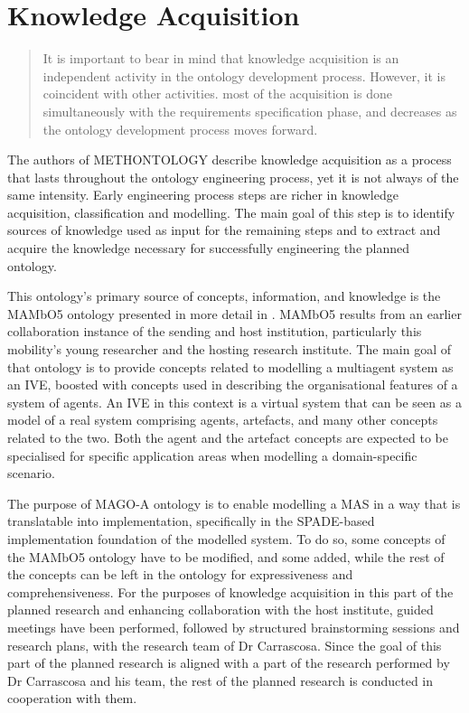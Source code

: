 \chapter{Knowledge Acquisition}\label{ch:Knowledge Acquisition}


\blockquote[{{\cite[p. 37]{fernandez-lopez1997METHONTOLOGYOntologicalArt}}}]{It is important to bear in mind that knowledge acquisition is an independent activity in the ontology development process. However, it is coincident with other activities. \textelp{} most of the acquisition is done simultaneously with the requirements specification phase, and decreases as the ontology development process moves forward.}

The authors of METHONTOLOGY describe knowledge acquisition as a process that lasts throughout the ontology engineering process, yet it is not always of the same intensity. Early engineering process steps are richer in knowledge acquisition, classification and modelling. The main goal of this step is to identify sources of knowledge used as input for the remaining steps and to extract and acquire the knowledge necessary for successfully engineering the planned ontology.

This ontology's primary source of concepts, information, and knowledge is the MAMbO5 ontology presented in more detail in \cite{okresaduric2019MAMbO5NewOntology}. MAMbO5 results from an earlier collaboration instance of the sending and host institution, particularly this mobility's young researcher and the hosting research institute. The main goal of that ontology is to provide concepts related to modelling a multiagent system as an \ac{IVE}, boosted with concepts used in describing the organisational features of a system of agents. An \ac{IVE} in this context is a virtual system that can be seen as a model of a real system comprising agents, artefacts, and many other concepts related to the two. Both the agent and the artefact concepts are expected to be specialised for specific application areas when modelling a domain-specific scenario.

The purpose of MAGO-A ontology is to enable modelling a \ac{MAS} in a way that is translatable into implementation, specifically in the SPADE-based implementation foundation of the modelled system. To do so, some concepts of the MAMbO5 ontology have to be modified, and some added, while the rest of the concepts can be left in the ontology for expressiveness and comprehensiveness. For the purposes of knowledge acquisition in this part of the planned research and enhancing collaboration with the host institute, guided meetings have been performed, followed by structured brainstorming sessions and research plans, with the research team of Dr Carrascosa. Since the goal of this part of the planned research is aligned with a part of the research performed by Dr Carrascosa and his team, the rest of the planned research is conducted in cooperation with them.


